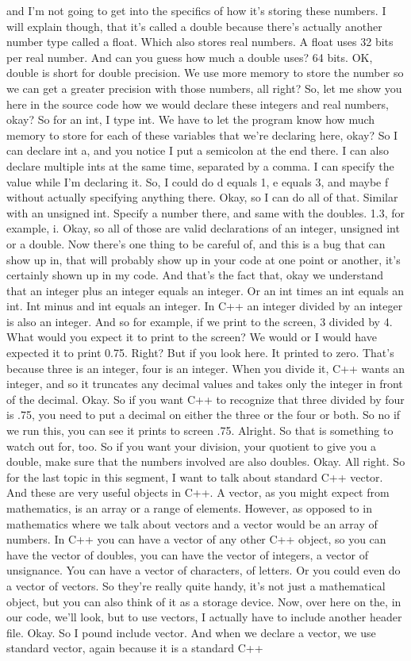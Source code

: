 \documentclass[10pt]{article}
\begin{document}
and I'm not going to get into the specifics of how it's storing these numbers. I will explain though, that it's called a double because there's actually another number type called a float. Which also stores real numbers. A float uses 32 bits per real number. And can you guess how much a double uses? 64 bits. OK, double is short for double precision. We use more memory to store the number so we can get a greater precision with those numbers, all right? So, let me show you here in the source code how we would declare these integers and real numbers, okay? So for an int, I type int. We have to let the program know how much memory to store for each of these variables that we're declaring here, okay? So I can declare int a, and you notice I put a semicolon at the end there. I can also declare multiple ints at the same time, separated by a comma. I can specify the value while I'm declaring it. So, I could do d equals 1, e equals 3, and maybe f without actually specifying anything there. Okay, so I can do all of that. Similar with an unsigned int. Specify a number there, and same with the doubles. 1.3, for example, i. Okay, so all of those are valid declarations of an integer, unsigned int or a double. Now there's one thing to be careful of, and this is a bug that can show up in, that will probably show up in your code at one point or another, it's certainly shown up in my code. And that's the fact that, okay we understand that an integer plus an integer equals an integer. Or an int times an int equals an int. Int minus and int equals an integer. In C++ an integer divided by an integer is also an integer. And so for example, if we print to the screen, 3 divided by 4. What would you expect it to print to the screen? We would or I would have expected it to print 0.75. Right? But if you look here. It printed to zero. That's because three is an integer, four is an integer. When you divide it, C++ wants an integer, and so it truncates any decimal values and takes only the integer in front of the decimal. Okay. So if you want C++ to recognize that three divided by four is .75, you need to put a decimal on either the three or the four or both. So no if we run this, you can see it prints to screen .75. Alright. So that is something to watch out for, too. So if you want your division, your quotient to give you a double, make sure that the numbers involved are also doubles. Okay. All right. So for the last topic in this segment, I want to talk about standard C++ vector. And these are very useful objects in C++. A vector, as you might expect from mathematics, is an array or a range of elements. However, as opposed to in mathematics where we talk about vectors and a vector would be an array of numbers. In C++ you can have a vector of any other C++ object, so you can have the vector of doubles, you can have the vector of integers, a vector of unsignance. You can have a vector of characters, of letters. Or you could even do a vector of vectors. So they're really quite handy, it's not just a mathematical object, but you can also think of it as a storage device. Now, over here on the, in our code, we'll look, but to use vectors, I actually have to include another header file. Okay. So I pound include vector. And when we declare a vector, we use standard vector, again because it is a standard C++ 
\end{document}
